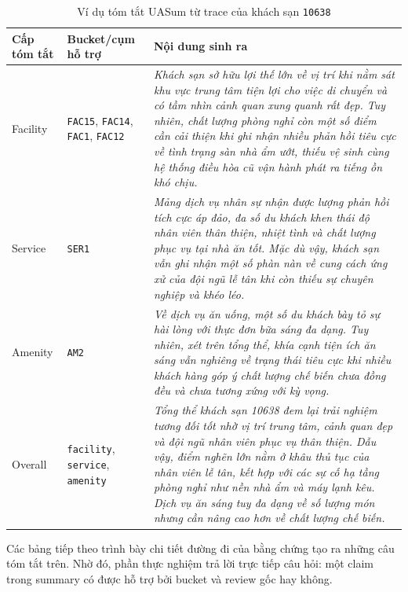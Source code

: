 \begin{table}[tbp]
\centering
\caption{Ví dụ tóm tắt UASum từ trace của khách sạn \texttt{10638}}
\label{tab:method1-10638-summary-trace}
\small
\setlength{\tabcolsep}{4pt}
\renewcommand{\arraystretch}{1.12}
\begin{tabularx}{\textwidth}{L{0.16\textwidth} L{0.18\textwidth} Y}
\toprule
\textbf{Cấp tóm tắt} & \textbf{Bucket/cụm hỗ trợ} & \textbf{Nội dung sinh ra} \\
\midrule
Facility &
\texttt{FAC15}, \texttt{FAC14}, \texttt{FAC1}, \texttt{FAC12} &
\textit{Khách sạn sở hữu lợi thế lớn về vị trí khi nằm sát khu vực trung tâm tiện lợi cho việc di chuyển và có tầm nhìn cảnh quan xung quanh rất đẹp. Tuy nhiên, chất lượng phòng nghỉ còn một số điểm cần cải thiện khi ghi nhận nhiều phản hồi tiêu cực về tình trạng sàn nhà ẩm ướt, thiếu vệ sinh cùng hệ thống điều hòa cũ vận hành phát ra tiếng ồn khó chịu.} \\
Service &
\texttt{SER1} &
\textit{Mảng dịch vụ nhân sự nhận được lượng phản hồi tích cực áp đảo, đa số du khách khen thái độ nhân viên thân thiện, nhiệt tình và chất lượng phục vụ tại nhà ăn tốt. Mặc dù vậy, khách sạn vẫn ghi nhận một số phàn nàn về cung cách ứng xử của đội ngũ lễ tân khi còn thiếu sự chuyên nghiệp và khéo léo.} \\
Amenity &
\texttt{AM2} &
\textit{Về dịch vụ ăn uống, một số du khách bày tỏ sự hài lòng với thực đơn bữa sáng đa dạng. Tuy nhiên, xét trên tổng thể, khía cạnh tiện ích ăn sáng vẫn nghiêng về trạng thái tiêu cực khi nhiều khách hàng góp ý chất lượng chế biến chưa đồng đều và chưa tương xứng với kỳ vọng.} \\
Overall &
\texttt{facility}, \texttt{service}, \texttt{amenity} &
\textit{Tổng thể khách sạn \num{10638} đem lại trải nghiệm tương đối tốt nhờ vị trí trung tâm, cảnh quan đẹp và đội ngũ nhân viên phục vụ thân thiện. Dẫu vậy, điểm nghẽn lớn nằm ở khâu thủ tục của nhân viên lễ tân, kết hợp với các sự cố hạ tầng phòng nghỉ như nền nhà ẩm và máy lạnh kêu. Dịch vụ ăn sáng tuy đa dạng về số lượng món nhưng cần nâng cao hơn về chất lượng chế biến.} \\
\bottomrule
\end{tabularx}
\end{table}

Các bảng tiếp theo trình bày chi tiết đường đi của bằng chứng tạo ra những câu
tóm tắt trên. Nhờ đó, phần thực nghiệm trả lời trực tiếp câu hỏi: một claim
trong summary có được hỗ trợ bởi bucket và review gốc hay không.


